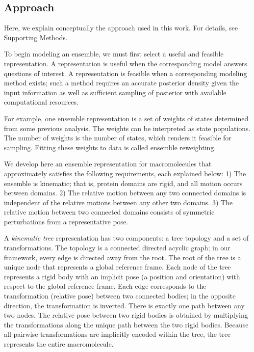 \documentclass[../main.tex]{subfiles}
\begin{document}
\begin{refsection}
\section{Approach}\label{approach}

Here, we explain conceptually the approach used in this work.
For details, see Supporting Methods.

To begin modeling an ensemble, we must first select a useful and feasible representation.
A representation is useful when the corresponding model answers questions of interest.
A representation is feasible when a corresponding modeling method exists; such a method requires an accurate posterior density given the input information as well as sufficient sampling of posterior with available computational resources.

For example, one ensemble representation is a set of weights of states determined from some previous analysis.
The weights can be interpreted as state populations.
The number of weights is the number of states, which renders it feasible for sampling.
Fitting these weights to data is called ensemble reweighting.

We develop here an ensemble representation for macromolecules that approximately satisfies the following requirements, each explained below:
1) The ensemble is kinematic; that is, protein domains are rigid, and all motion occurs between domains.
2) The relative motion between any two connected domains is independent of the relative motions between any other two domains.
3) The relative motion between two connected domains consists of symmetric perturbations from a representative pose.

A \emph{kinematic tree} representation has two components: a tree topology and a set of transformations.
The topology is a connected directed acyclic graph; in our framework, every edge is directed away from the root.
The root of the tree is a unique node that represents a global reference frame.
Each node of the tree represents a rigid body with an implicit pose (a position and orientation) with respect to the global reference frame.
Each edge corresponds to the transformation (relative pose) between two connected bodies; in the opposite direction, the transformation is inverted.
There is exactly one path between any two nodes.
The relative pose between two rigid bodies is obtained by multiplying the transformations along the unique path between the two rigid bodies.
Because all pairwise transformations are implicitly encoded within the tree, the tree represents the entire macromolecule.


\end{refsection}
\end{document}
